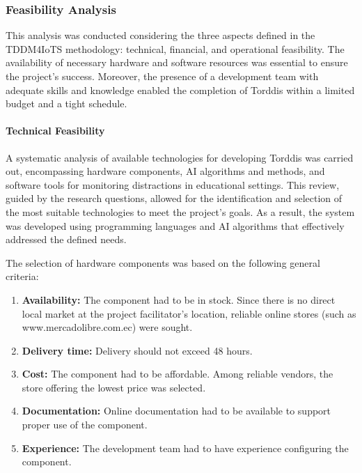                 \subsubsection{Feasibility Analysis}
                This analysis was conducted considering the three aspects defined in the TDDM4IoTS methodology: technical, financial, and operational feasibility. The availability of necessary hardware and software resources was essential to ensure the project's success. Moreover, the presence of a development team with adequate skills and knowledge enabled the completion of Torddis within a limited budget and a tight schedule.
                
                \paragraph{Technical Feasibility}
                A systematic analysis of available technologies for developing Torddis was carried out, encompassing hardware components, AI algorithms and methods, and software tools for monitoring distractions in educational settings. This review, guided by the research questions, allowed for the identification and selection of the most suitable technologies to meet the project’s goals. As a result, the system was developed using programming languages and AI algorithms that effectively addressed the defined needs.
                
                The selection of hardware components was based on the following general criteria:
                
                \begin{enumerate}
                    \item \textbf{Availability:} The component had to be in stock. Since there is no direct local market at the project facilitator’s location, reliable online stores (such as www.mercadolibre.com.ec) were sought.
                    
                    \item \textbf{Delivery time:} Delivery should not exceed 48 hours.
                    
                    \item \textbf{Cost:} The component had to be affordable. Among reliable vendors, the store offering the lowest price was selected.
                    
                    \item \textbf{Documentation:} Online documentation had to be available to support proper use of the component.
                    
                    \item \textbf{Experience:} The development team had to have experience configuring the component.
                \end{enumerate}
                
